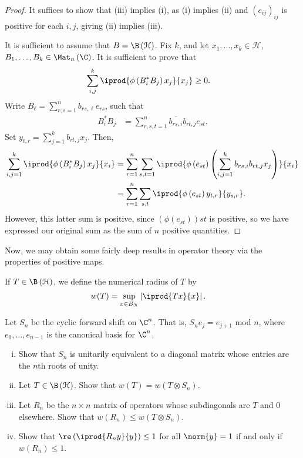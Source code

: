 \documentclass[10pt]{mypackage}
\begin{document}
\begin{proof}
  It suffices to show that (iii) implies (i), as (i) implies (ii) and $\left( e_{ij} \right)_{ij}$ is positive for each $i,j$, giving (ii) implies (iii).\newline

  It is sufficient to assume that $B = \B\left( \mathcal{H} \right)$. Fix $k$, and let $x_1,\dots,x_k\in \mathcal{H}$, $B_1,\dots,B_k\in \Mat_n\left( \C \right)$. It is sufficient to prove that
  \begin{align*}
    \sum_{i,j}^{k} \iprod{\phi\left( B_i^{\ast}B_j \right)x_j}{x_j} &\geq 0.
  \end{align*}
  Write $B_{\ell} = \sum_{r,s=1}^{n}b_{rs,\ell}e_{rs}$, such that
  \begin{align*}
    B_i^{\ast}B_j &= \sum_{r,s,t=1}^{n}\overline{b_{rs,i}}b_{rt,j}e_{st}.
  \end{align*}
  Set $y_{t,r} = \sum_{j=1}^{k}b_{rt,j}x_j$. Then,
  \begin{align*}
    \sum_{i,j=1}^{k} \iprod{\phi\left( B_i^{\ast}B_j \right)x_j}{x_i} &= \sum_{r=1}^{n}\sum_{s,t=1} \iprod{\phi\left( e_{st} \right)\left( \sum_{i,j=1}^{k}b_{rs,i}b_{rt,j}x_j \right)}{x_i}\\
                                                                      &= \sum_{r=1}^{n}\sum_{s,t} \iprod{\phi\left( e_{st} \right)y_{t,r}}{y_{s,r}}.
  \end{align*}
  However, this latter sum is positive, since $\left( \phi\left( e_{st} \right) \right)st$ is positive, so we have expressed our original sum as the sum of $n$ positive quantities.
\end{proof}
Now, we may obtain some fairly deep results in operator theory via the properties of positive maps.
\begin{definition}
  If $T\in \B\left( \mathcal{H} \right)$, we define the numerical radius of $T$ by
  \begin{align*}
    w(T) &= \sup_{x\in B_{\mathcal{H}}} \left\vert \iprod{Tx}{x} \right\vert.
  \end{align*}
\end{definition}
\begin{exercise}
  Let $S_n$ be the cyclic forward shift on $\C^n$. That is, $S_n e_j = e_{j+1}$ mod $n$, where $e_0,\dots,e_{n-1}$ is the canonical basis for $\C^n$.
  \begin{enumerate}[(i)]
    \item Show that $S_n$ is unitarily equivalent to a diagonal matrix whose entries are the $n$th roots of unity.
    \item Let $T\in \B\left( \mathcal{H} \right)$. Show that $w\left( T \right) = w\left( T\otimes S_n \right)$.
    \item Let $R_n$ be the $n\times n$ matrix of operators whose subdiagonals are $T$ and $0$ elsewhere. Show that $w\left(R_n\right)\leq w\left( T\otimes S_n \right)$.
    \item Show that $\re\left( \iprod{R_ny}{y} \right) \leq 1$ for all $\norm{y} = 1$ if and only if $w\left( R_n \right) \leq 1$.
  \end{enumerate}
\end{exercise}
\end{document}
